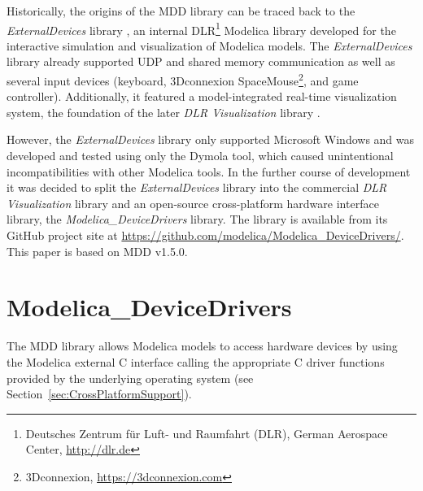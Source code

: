\documentclass{resources/modelica}
\newcommand{\BTHI}[1]{}
\begin{document}
Historically, the origins of the MDD library can be traced back to the
\emph{ExternalDevices} library \citep{Bellmann2009}, an internal
DLR\footnote{Deutsches Zentrum für Luft- und Raumfahrt (DLR), German Aerospace
Center, \url{http://dlr.de}} Modelica library developed for the interactive
simulation and visualization of Modelica models. The \emph{ExternalDevices}
library already supported UDP and shared memory communication
as well as several input devices (keyboard, 3Dconnexion
SpaceMouse\footnote{3Dconnexion, \url{https://3dconnexion.com}}, and game
controller). Additionally, it featured a model-integrated real-time
visualization system, the foundation of the later \emph{DLR Visualization} library \citep{Hellerer2014}.

However, the \emph{ExternalDevices} library only supported
Microsoft Windows and was developed and tested using only the Dymola tool,
which caused unintentional incompatibilities with other Modelica tools.
In the further course of
development it was decided to split the \emph{ExternalDevices} library into the
commercial \emph{DLR Visualization} library and an open-source cross-platform hardware
interface library, the \emph{Modelica\_DeviceDrivers} library. The library is
available from its GitHub project site at
\url{https://github.com/modelica/Modelica_DeviceDrivers/}.
This paper is based on MDD v1.5.0.




\section{Modelica\_DeviceDrivers}
\label{ModelicaDeviceDrivers}
\BTHI{TODO: Bernhard, Thomas, Volker}

The MDD library allows Modelica models to access hardware devices by using the Modelica external C interface calling the appropriate C driver functions provided by the underlying operating system (see
Section~\ref{sec:CrossPlatformSupport}).
\end{document}
